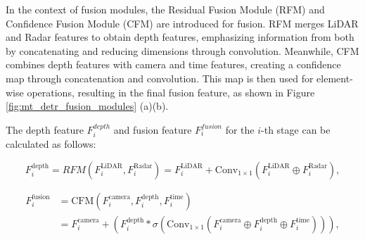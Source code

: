 \documentclass[report.tex]{subfiles}
\begin{document}
    In the context of fusion modules, the Residual Fusion Module (RFM) and Confidence Fusion Module (CFM) are introduced for fusion. RFM merges LiDAR and Radar features to obtain depth features, emphasizing information from both by concatenating and reducing dimensions through convolution. Meanwhile, CFM combines depth features with camera and time features, creating a confidence map through concatenation and convolution. This map is then used for element-wise operations, resulting in the final fusion feature, as shown in Figure \ref{fig:mt_detr_fusion_modules} (a)(b).

    The depth feature $F_{i}^{depth}$ and fusion feature $F_{i}^{fusion}$ for the $i$-th stage can be calculated as follows:


    \begin{equation}
        F_{i}^{\text{depth}} = RFM(F_{i}^{\text{LiDAR}}, F_{i}^{\text{Radar}}) = F_{i}^{\text{LiDAR}} + \text{Conv}_{1\times1}(F_{i}^{\text{LiDAR}} \oplus F_{i}^{\text{Radar}}),
    \end{equation}


    \begin{equation}
        \begin{split}
            F_{i}^{\text{fusion}} &= \text{CFM}\left(F_{i}^{\text{camera}}, F_{i}^{\text{depth}}, F_{i}^{\text{time}}\right) \\
            &= F_{i}^{\text{camera}} + \left(F_{i}^{\text{depth}} * \sigma\left(\text{Conv}_{1\times1}\left(F_{i}^{\text{camera}} \oplus F_{i}^{\text{depth}} \oplus F_{i}^{\text{time}}\right)\right)\right),
        \end{split}
        \end{equation}
        

\end{document}
